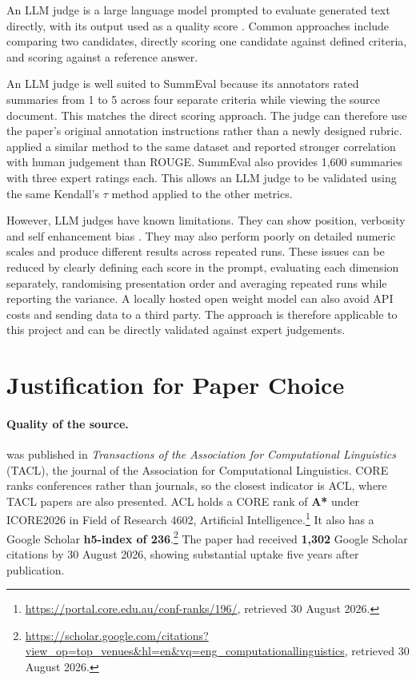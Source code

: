\documentclass[11pt]{article}
\begin{document}
An LLM judge is a large language model prompted to evaluate generated text directly, with its output used as a quality score \citep{zheng-etal-2023-judging}. Common approaches include comparing two candidates, directly scoring one candidate against defined criteria, and scoring against a reference answer.

An LLM judge is well suited to SummEval because its annotators rated summaries from 1 to 5 across four separate criteria while viewing the source document. This matches the direct scoring approach. The judge can therefore use the paper's original annotation instructions rather than a newly designed rubric. \citet{liu-etal-2023-geval} applied a similar method to the same dataset and reported stronger correlation with human judgement than ROUGE. SummEval also provides 1{,}600 summaries with three expert ratings each. This allows an LLM judge to be validated using the same Kendall's $\tau$ method applied to the other metrics.

However, LLM judges have known limitations. They can show position, verbosity and self enhancement bias \citep{zheng-etal-2023-judging}. They may also perform poorly on detailed numeric scales and produce different results across repeated runs. These issues can be reduced by clearly defining each score in the prompt, evaluating each dimension separately, randomising presentation order and averaging repeated runs while reporting the variance. A locally hosted open weight model can also avoid API costs and sending data to a third party. The approach is therefore applicable to this project and can be directly validated against expert judgements.

\section{Justification for Paper Choice}
\label{sec:justification}

\paragraph{Quality of the source.}
\citet{fabbri-etal-2021-summeval} was published in \emph{Transactions of the Association for Computational Linguistics} (TACL), the journal of the Association for Computational Linguistics. CORE ranks conferences rather than journals, so the closest indicator is ACL, where TACL papers are also presented. ACL holds a CORE rank of \textbf{A*} under ICORE2026 in Field of Research 4602, Artificial Intelligence.\footnote{\url{https://portal.core.edu.au/conf-ranks/196/}, retrieved 30 August 2026.} It also has a Google Scholar \textbf{h5-index of 236}.\footnote{\url{https://scholar.google.com/citations?view_op=top_venues&hl=en&vq=eng_computationallinguistics}, retrieved 30 August 2026.} The paper had received \textbf{1{,}302} Google Scholar citations by 30 August 2026, showing substantial uptake five years after publication.
\end{document}
